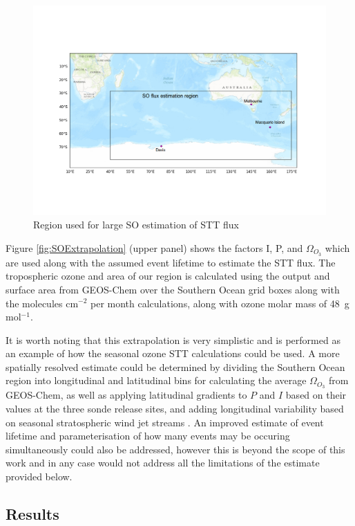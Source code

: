     \begin{figure}[t]
      \includegraphics[width=12.0cm]{../figures/OzoneSORegion.png}
      \caption{%
	Region used for large SO estimation of STT flux}
      \label{fig:SORegion}
    \end{figure}
    
    Figure \ref{fig:SOExtrapolation} (upper panel) shows the factors I, P, and $\Omega_{O_3}$ which are used along with the assumed event lifetime to estimate the STT flux.
    The tropospheric ozone and area of our region is calculated using the output and surface area from GEOS-Chem over the Southern Ocean grid boxes along with the molecules cm$^{-2}$ per month calculations, along with ozone molar mass of 48~g mol$^{-1}$.
    
    It is worth noting that this extrapolation is very simplistic and is performed as an example of how the seasonal ozone STT calculations could be used.
    A more spatially resolved estimate could be determined by dividing the Southern Ocean region into longitudinal and latitudinal bins for calculating the average $\Omega_{O_3}$ from GEOS-Chem, as well as applying latitudinal gradients to $P$ and $I$ based on their values at the three sonde release sites, and adding longitudinal variability based on seasonal stratospheric wind jet streams \citep{Baray2012, Skerlak2015}.
    An improved estimate of event lifetime and parameterisation of how many events may be occuring simultaneously could also be addressed, however this is beyond the scope of this work and in any case would not address all the limitations of the estimate provided below.
  \subsection{Results}
    
